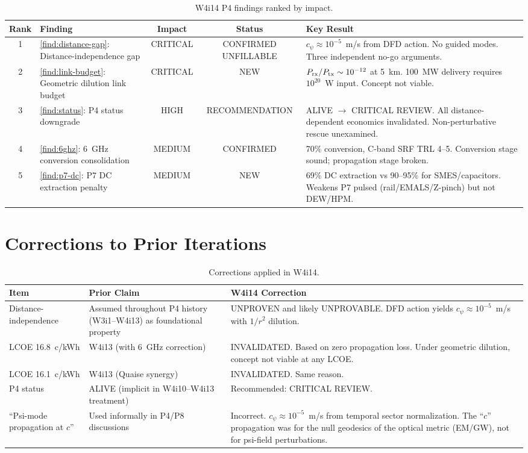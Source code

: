 \documentclass[11pt]{article}
\begin{document}
\begin{table}[H]
\centering
\caption{W4i14 P4 findings ranked by impact.}
\label{tab:rankings}
\begin{tabular}{@{}clccp{5.5cm}@{}}
\toprule
Rank & Finding & Impact & Status & Key Result \\
\midrule
1 & \ref{find:distance-gap}: Distance-independence gap & CRITICAL &
  CONFIRMED UNFILLABLE & $c_\psi \approx 10^{-5}$~m/s from DFD action.
  No guided modes. Three independent no-go arguments. \\
2 & \ref{find:link-budget}: Geometric dilution link budget & CRITICAL &
  NEW & $P_{\rm rx}/P_{\rm tx} \sim 10^{-12}$ at 5~km. 100~MW delivery
  requires $10^{20}$~W input. Concept not viable. \\
3 & \ref{find:status}: P4 status downgrade & HIGH &
  RECOMMENDATION & ALIVE $\to$ CRITICAL REVIEW. All distance-dependent
  economics invalidated. Non-perturbative rescue unexamined. \\
4 & \ref{find:6ghz}: 6~GHz conversion consolidation & MEDIUM &
  CONFIRMED & 70\% conversion, C-band SRF TRL 4--5. Conversion stage
  sound; propagation stage broken. \\
5 & \ref{find:p7-dc}: P7 DC extraction penalty & MEDIUM &
  NEW & 69\% DC extraction vs 90--95\% for SMES/capacitors. Weakens
  P7 pulsed (rail/EMALS/Z-pinch) but not DEW/HPM. \\
\bottomrule
\end{tabular}
\end{table}

\section{Corrections to Prior Iterations}

\begin{table}[H]
\centering
\caption{Corrections applied in W4i14.}
\label{tab:corrections}
\begin{tabular}{@{}lp{5cm}p{5cm}@{}}
\toprule
Item & Prior Claim & W4i14 Correction \\
\midrule
Distance-independence & Assumed throughout P4 history (W3i1--W4i13) as
  foundational property & UNPROVEN and likely UNPROVABLE. DFD action yields
  $c_\psi \approx 10^{-5}$~m/s with $1/r^2$ dilution. \\
LCOE 16.8~c/kWh & W4i13 (with 6~GHz correction) & INVALIDATED. Based on
  zero propagation loss. Under geometric dilution, concept not viable at
  any LCOE. \\
LCOE 16.1~c/kWh & W4i13 (Quaise synergy) & INVALIDATED. Same reason. \\
P4 status & ALIVE (implicit in W4i10--W4i13 treatment) & Recommended:
  CRITICAL REVIEW. \\
``Psi-mode propagation at $c$'' & Used informally in P4/P8 discussions &
  Incorrect. $c_\psi \approx 10^{-5}$~m/s from temporal sector normalization.
  The ``$c$'' propagation was for the null geodesics of the optical metric
  (EM/GW), not for psi-field perturbations. \\
\bottomrule
\end{tabular}
\end{table}
\end{document}
